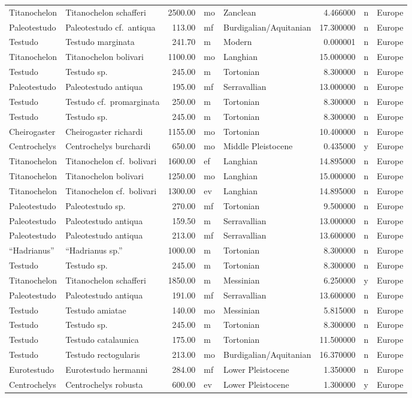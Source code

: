 \documentclass[]{article}
\begin{document}
\begin{longtable}[]{@{}llrllrll@{}}
Titanochelon & Titanochelon schafferi & 2500.00 & mo & Zanclean &
4.466000 & n & Europe\tabularnewline
Paleotestudo & Paleotestudo cf.~antiqua & 113.00 & mf &
Burdigalian/Aquitanian & 17.300000 & n & Europe\tabularnewline
Testudo & Testudo marginata & 241.70 & m & Modern & 0.000001 & n &
Europe\tabularnewline
Titanochelon & Titanochelon bolivari & 1100.00 & mo & Langhian &
15.000000 & n & Europe\tabularnewline
Testudo & Testudo sp. & 245.00 & m & Tortonian & 8.300000 & n &
Europe\tabularnewline
Paleotestudo & Paleotestudo antiqua & 195.00 & mf & Serravallian &
13.000000 & n & Europe\tabularnewline
Testudo & Testudo cf.~promarginata & 250.00 & m & Tortonian & 8.300000 &
n & Europe\tabularnewline
Testudo & Testudo sp. & 245.00 & m & Tortonian & 8.300000 & n &
Europe\tabularnewline
Cheirogaster & Cheirogaster richardi & 1155.00 & mo & Tortonian &
10.400000 & n & Europe\tabularnewline
Centrochelys & Centrochelys burchardi & 650.00 & mo & Middle Pleistocene
& 0.435000 & y & Europe\tabularnewline
Titanochelon & Titanochelon cf.~bolivari & 1600.00 & ef & Langhian &
14.895000 & n & Europe\tabularnewline
Titanochelon & Titanochelon bolivari & 1250.00 & mo & Langhian &
15.000000 & n & Europe\tabularnewline
Titanochelon & Titanochelon cf.~bolivari & 1300.00 & ev & Langhian &
14.895000 & n & Europe\tabularnewline
Paleotestudo & Paleotestudo sp. & 270.00 & mf & Tortonian & 9.500000 & n
& Europe\tabularnewline
Paleotestudo & Paleotestudo antiqua & 159.50 & m & Serravallian &
13.000000 & n & Europe\tabularnewline
Paleotestudo & Paleotestudo antiqua & 213.00 & mf & Serravallian &
13.600000 & n & Europe\tabularnewline
``Hadrianus'' & ``Hadrianus sp.'' & 1000.00 & m & Tortonian & 8.300000 &
n & Europe\tabularnewline
Testudo & Testudo sp. & 245.00 & m & Tortonian & 8.300000 & n &
Europe\tabularnewline
Titanochelon & Titanochelon schafferi & 1850.00 & m & Messinian &
6.250000 & y & Europe\tabularnewline
Paleotestudo & Paleotestudo antiqua & 191.00 & mf & Serravallian &
13.600000 & n & Europe\tabularnewline
Testudo & Testudo amiatae & 140.00 & mo & Messinian & 5.815000 & n &
Europe\tabularnewline
Testudo & Testudo sp. & 245.00 & m & Tortonian & 8.300000 & n &
Europe\tabularnewline
Testudo & Testudo catalaunica & 175.00 & m & Tortonian & 11.500000 & n &
Europe\tabularnewline
Testudo & Testudo rectogularis & 213.00 & mo & Burdigalian/Aquitanian &
16.370000 & n & Europe\tabularnewline
Eurotestudo & Eurotestudo hermanni & 284.00 & mf & Lower Pleistocene &
1.350000 & n & Europe\tabularnewline
Centrochelys & Centrochelys robusta & 600.00 & ev & Lower Pleistocene &
1.300000 & y & Europe\tabularnewline

\end{longtable}
\end{document}
